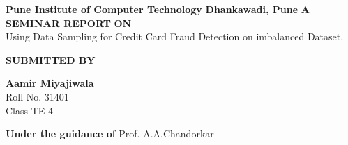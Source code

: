 \documentclass[a4paper, 12pt]{article}
\begin{document}
 
\begin{titlepage}
    \begin{center}
        \vspace*{1cm}
        
        \large
                \textbf{Pune Institute of Computer Technology}	
                \linebreak
		\textbf{Dhankawadi, Pune}
        \vspace{0.5cm}
                        \linebreak
                        \linebreak
        \textbf{A SEMINAR REPORT }
        \linebreak
        \textbf{ON }
        \linebreak
        \vspace{0.5cm}
        \large
        \\Using Data Sampling for Credit Card Fraud Detection on imbalanced Dataset. 
        \linebreak
        \linebreak
		
		\textbf{SUBMITTED BY}
		\vspace{1cm}
		
        \textbf{ Aamir Miyajiwala }
        \\ Roll No. 31401
        \\ Class TE 4
        \linebreak
        \linebreak
		        
        \textbf{\large{Under the guidance of}}
		\linebreak
	    Prof. A.A.Chandorkar
		\linebreak
        
        
        
        \vspace{0.8cm}
        


\end{center}
\end{titlepage}
\end{document}
